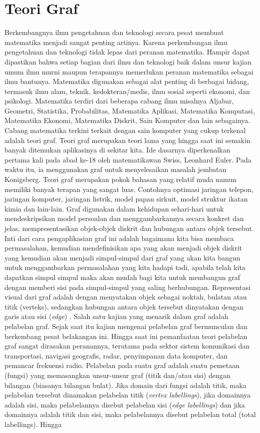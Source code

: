\section{Teori Graf}

Berkembangnya ilmu pengetahuan dan teknologi secara pesat membuat matematika menjadi sangat penting artinya. Karena perkembangan ilmu pengetahuan dan teknologi tidak lepas dari peranan matematika. Hampir dapat dipastikan bahwa setiap bagian dari ilmu dan teknologi baik dalam unsur kajian  umum ilmu murni maupun terapannya memerlukan peranan matematika sebagai ilmu bantunya. Matematika digunakan sebagai alat penting di berbagai bidang, termasuk ilmu alam, teknik, kedokteran/medis, ilmu sosial seperti ekonomi, dan psikologi. Matematika terdiri dari beberapa cabang ilmu misalnya Aljabar, Geometri, Statistika, Probabilitas, Matematika Aplikasi, Matematika Komputasi, Matematika Ekonomi, Matematika Diskrit, Sain Komputer dan lain sebagainya. Cabang matematika terkini terkait dengan sain komputer yang cukup terkenal adalah teori graf. Teori graf merupakan teori lama yang hingga saat ini semakin banyak ditemukan aplikasinya di sekitar kita. Ide dasarnya diperkenalkan pertama kali pada abad ke-18 oleh matematikawan Swiss, Leonhard Euler. Pada waktu itu, ia menggunakan graf untuk menyelesaikan masalah jembatan Konigsberg. Teori graf merupakan pokok bahasan yang relatif muda namun memiliki banyak terapan yang sangat luas. Contohnya optimasi jaringan telepon, jaringan komputer, jaringan listrik, model papan sirkuit, model struktur ikatan kimia dan lain-lain. Graf digunakan dalam kehidupan sehari-hari untuk mendeskripsikan model persoalan dan menggambarkannya secara konkret dan jelas, mempresentasikan objek-objek diskrit dan hubungan antara objek tersebut. Inti dari cara pengaplikasian graf ini adalah bagaimana kita bisa membaca permasalahan, kemudian mendefinisikan apa yang akan menjadi objek diskrit yang kemudian akan menjadi simpul-simpul dari graf yang akan kita bangun untuk menggambarkan permasalahan yang kita hadapi tadi, apabila telah kita dapatkan simpul simpul maka akan mudah bagi kita untuk membangun graf dengan memberi sisi pada simpul-simpul yang saling berhubungan. Representasi visual dari graf adalah dengan menyatakan objek sebagai noktah, bulatan atau titik (verteks), sedangkan hubungan antara objek tersebut dinyatakan dengan garis atau sisi (\textit{edge}) \citep{Rahayuningsih2018}. Salah satu kajian yang menarik dalam graf adalah pelabelan graf. Sejak saat itu kajian mengenai pelabelan graf bermunculan dan berkembang pesat belakangan ini. Hingga saat ini pemanfaatan teori pelabelan graf sangat dirasakan peranannya, terutama pada sektor sistem komunikasi dan transportasi, navigasi geografis, radar, penyimpanan data komputer, dan pemancar frekuensi radio. Pelabelan pada suatu graf adalah suatu pemetaan (fungsi) yang memasangkan unsur-unsur graf (titik dan/atau sisi) dengan bilangan (biasanya bilangan bulat). Jika domain dari fungsi adalah titik, maka pelabelan tersebut dinamakan pelabelan titik (\textit{vertex labellings}), jika domainnya adalah sisi, maka pelabelannya disebut pelabelan sisi (\textit{edge labellings}) dan jika domainnya adalah titik dan sisi, maka pelabelannya disebut pelabelan total (total labellings). Hingga 